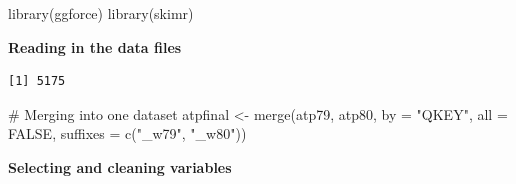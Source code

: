 \documentclass[
  letterpaper,
  DIV=11,
  numbers=noendperiod]{scrartcl}
\newenvironment{Shaded}{\begin{snugshade}}{\end{snugshade}}
\newcommand{\AttributeTok}[1]{\textcolor[rgb]{0.40,0.45,0.13}{#1}}
\newcommand{\CommentTok}[1]{\textcolor[rgb]{0.37,0.37,0.37}{#1}}
\newcommand{\ConstantTok}[1]{\textcolor[rgb]{0.56,0.35,0.01}{#1}}
\newcommand{\FunctionTok}[1]{\textcolor[rgb]{0.28,0.35,0.67}{#1}}
\newcommand{\NormalTok}[1]{\textcolor[rgb]{0.00,0.23,0.31}{#1}}
\newcommand{\OtherTok}[1]{\textcolor[rgb]{0.00,0.23,0.31}{#1}}
\newcommand{\SpecialCharTok}[1]{\textcolor[rgb]{0.37,0.37,0.37}{#1}}
\newcommand{\StringTok}[1]{\textcolor[rgb]{0.13,0.47,0.30}{#1}}
\begin{document}
\begin{Shaded}
\begin{Highlighting}[]
\FunctionTok{library}\NormalTok{(ggforce)}
\FunctionTok{library}\NormalTok{(skimr)}
\end{Highlighting}
\end{Shaded}

\textbf{Reading in the data files}

\begin{Shaded}
\end{Shaded}

\begin{verbatim}
[1] 5175
\end{verbatim}

\begin{Shaded}
\begin{Highlighting}[]
\CommentTok{\# Merging into one dataset}
\NormalTok{atpfinal }\OtherTok{\textless{}{-}} \FunctionTok{merge}\NormalTok{(atp79, atp80, }\AttributeTok{by =} \StringTok{"QKEY"}\NormalTok{, }\AttributeTok{all =} \ConstantTok{FALSE}\NormalTok{, }\AttributeTok{suffixes =} \FunctionTok{c}\NormalTok{(}\StringTok{"\_w79"}\NormalTok{, }\StringTok{"\_w80"}\NormalTok{))}
\end{Highlighting}
\end{Shaded}

\textbf{Selecting and cleaning variables}
\end{document}
